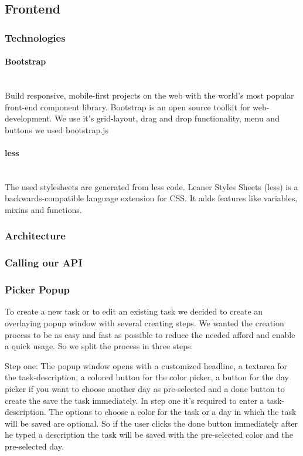 \subsection{Frontend}
\subsubsection{Technologies}
\paragraph{Bootstrap}\mbox{}\\
Build responsive, mobile-first projects on the web with the world’s most popular front-end component library.
Bootstrap is an open source toolkit for web-development. 
We use it's grid-layout, drag and drop functionality, menu and buttons we used bootstrap.js 
\paragraph{less}\mbox{}\\
The used stylesheets are generated from less code. 
Leaner Styles Sheets (less) is a backwards-compatible language extension for CSS. It adds features like variables, mixins and functions.


\subsubsection{Architecture}
\subsubsection{Calling our API}

\subsubsection{Picker Popup}


To create a new task or to edit an existing task we decided to create an overlaying popup window with several creating steps.
We wanted the creation process to be as easy and fast as possible to reduce the needed afford and enable a quick usage.
So we split the process in three steps:

Step one:
The popup window opens with a customized headline, a textarea for the task-description, a colored button for the color picker, a button for the day picker if you want to choose another day as pre-selected and a done button to create the save the task immediately.
In step one it’s required to enter a task-description. The options to choose a color for the task or a day in which the task will be saved are optional. So if the user clicks the done button immediately after he typed a description the task will be saved with the pre-selected color and the pre-selected day. 

